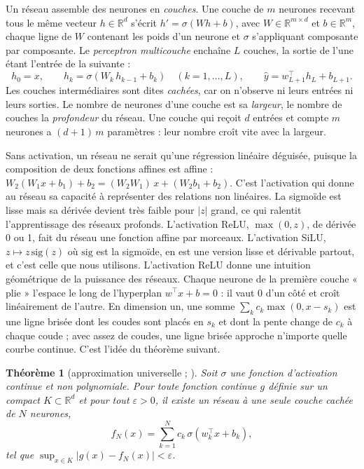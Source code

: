 \documentclass[11pt,a4paper]{article}
\newtheorem*{theoreme}{Théorème}
\begin{document}
Un réseau assemble des neurones en \emph{couches}. Une couche de $m$ neurones recevant tous le même vecteur
$h \in \mathbb{R}^{d}$ s'écrit $h' = \sigma(W h + b)$, avec $W \in \mathbb{R}^{m \times d}$ et $b \in \mathbb{R}^{m}$,
chaque ligne de $W$ contenant les poids d'un neurone et $\sigma$ s'appliquant composante par composante. Le
\emph{perceptron multicouche} enchaîne $L$ couches, la sortie de l'une étant l'entrée de la suivante :
\begin{equation}\label{eq:mlp}
h_0 = x, \qquad h_k = \sigma(W_k\, h_{k-1} + b_k) \quad (k = 1, \dots, L), \qquad \hat y = w_{L+1}^\top h_L + b_{L+1} .
\end{equation}
Les couches intermédiaires sont dites \emph{cachées}, car on n'observe ni leurs entrées ni leurs sorties. Le nombre de
neurones d'une couche est sa \emph{largeur}, le nombre de couches la \emph{profondeur} du réseau. Une couche qui
reçoit $d$ entrées et compte $m$ neurones a $(d + 1)\,m$ paramètres : leur nombre croît vite avec la largeur.

Sans activation, un réseau ne serait qu'une régression linéaire déguisée, puisque la composition de deux fonctions
affines est affine : $W_2(W_1 x + b_1) + b_2 = (W_2 W_1)\,x + (W_2 b_1 + b_2)$. C'est l'activation qui donne au
réseau sa capacité à représenter des relations non linéaires. La sigmoïde est lisse mais sa dérivée devient très
faible pour $\lvert z \rvert$ grand, ce qui ralentit l'apprentissage des réseaux profonds. L'activation ReLU,
$\max(0, z)$, de dérivée 0 ou 1, fait du réseau une fonction affine par morceaux. L'activation SiLU,
$z \mapsto z\,\mathrm{sig}(z)$ où $\mathrm{sig}$ est la sigmoïde, en est une version lisse et dérivable partout, et
c'est celle que nous utilisons. L'activation ReLU donne une intuition géométrique de la puissance des réseaux. Chaque
neurone de la première couche « plie » l'espace le long de l'hyperplan $w^\top x + b = 0$ : il vaut 0 d'un côté et
croît linéairement de l'autre. En dimension un, une somme $\sum_k c_k \max(0, x - s_k)$ est une ligne brisée dont les
coudes sont placés en $s_k$ et dont la pente change de $c_k$ à chaque coude ; avec assez de coudes, une ligne brisée
approche n'importe quelle courbe continue. C'est l'idée du théorème suivant.

\begin{theoreme}[approximation universelle ; \citealp{cybenko1989, hornik1991, leshno1993}]
Soit $\sigma$ une fonction d'activation continue et non polynomiale. Pour toute fonction continue $g$ définie sur un
compact $K \subset \mathbb{R}^d$ et pour tout $\varepsilon > 0$, il existe un réseau à une seule couche cachée de $N$
neurones,
\[
f_N(x) = \sum_{k=1}^{N} c_k\,\sigma(w_k^\top x + b_k),
\]
tel que $\sup_{x \in K} \lvert g(x) - f_N(x) \rvert < \varepsilon$.
\end{theoreme}
\end{document}
